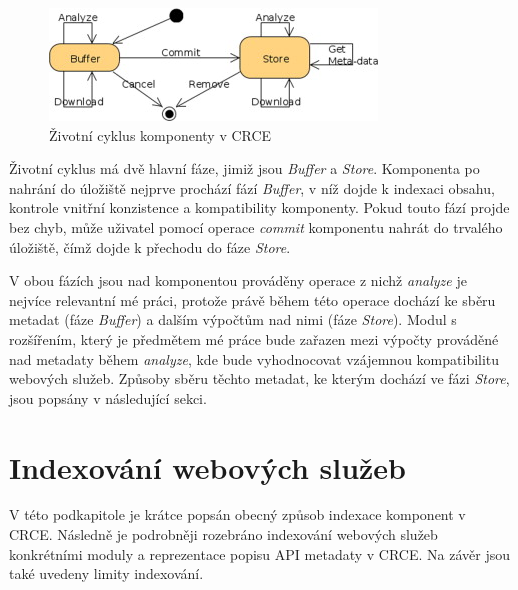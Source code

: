 \documentclass[czech,DP]{thesiskiv}
\begin{document}
\begin{figure}[h]
	\centering
	\includegraphics{crce-component-lc.jpg}
	\caption{Životní cyklus komponenty v CRCE}
	\label{fig:crce-comp-lc}
\end{figure} 

Životní cyklus má dvě hlavní fáze, jimiž jsou \textit{Buffer} a \textit{Store}. Komponenta po nahrání do úložiště nejprve prochází fází \textit{Buffer}, v níž dojde k indexaci obsahu, kontrole vnitřní konzistence a kompatibility komponenty. Pokud touto fází projde bez chyb, může uživatel pomocí operace \textit{commit} komponentu nahrát do trvalého úložiště, čímž dojde k přechodu  do fáze \textit{Store}.

V obou fázích jsou nad komponentou prováděny operace z nichž \textit{analyze} je nejvíce relevantní mé práci, protože právě během této operace dochází ke sběru metadat (fáze \textit{Buffer}) a dalším výpočtům nad nimi (fáze \textit{Store}). Modul s rozšířením, který je předmětem mé práce bude zařazen mezi výpočty prováděné nad metadaty během \textit{analyze}, kde bude vyhodnocovat vzájemnou kompatibilitu webových služeb. Způsoby sběru těchto metadat, ke kterým dochází ve fázi \textit{Store}, jsou popsány v následující sekci. 

%
%
%
%
%
%
%

\section{Indexování webových služeb}
\label{sec:api-index}

V této podkapitole je krátce popsán obecný způsob indexace komponent v CRCE. Následně je podrobněji rozebráno indexování webových služeb konkrétními moduly a reprezentace popisu API metadaty v CRCE. Na závěr jsou také uvedeny limity indexování.
\end{document}
